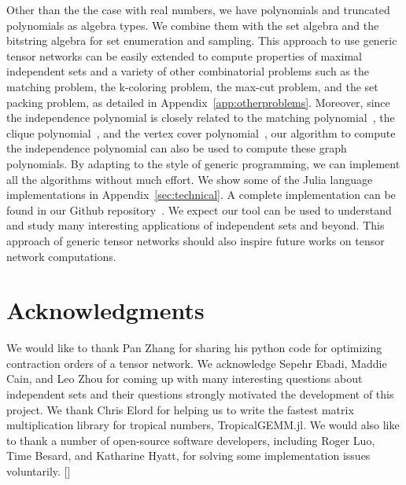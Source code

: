 \documentclass[onefignum, onetabnum]{siamart190516}
\newcommand{\<}{\langle}
\renewcommand{\>}{\rangle}
\newcommand{\App}[1]{Appendix~\ref{#1}}
\newcommand{\blue}[1]{[{\bf  \color{blue}{JG: #1}}]}
\begin{document}
Other than the the case with real numbers, we have polynomials and truncated polynomials as algebra types. We combine them with the set algebra and the bitstring algebra for set enumeration and sampling. 
This approach to use generic tensor networks can be easily extended to compute properties of maximal independent sets and a variety of other combinatorial problems such as the matching problem, the k-coloring problem, the max-cut problem, and the set packing problem, as detailed in \App{app:otherproblems}. 
Moreover, since the independence polynomial is closely related to the matching polynomial~\cite{Levit2005}, the clique polynomial~\cite{Hoede1994}, and the vertex cover polynomial~\cite{Akbari2013},
our algorithm to compute the independence polynomial can also be used to compute these graph polynomials.
By adapting to the style of generic programming, we can implement all the algorithms without much effort.
We show some of the Julia language implementations in Appendix~\ref{sec:technical}.
A complete implementation can be found in our Github repository~\cite{GraphTensorNetworks}. 
We expect our tool can be used to understand and study many interesting applications of independent sets and beyond. This approach of generic tensor networks should also inspire future works on tensor network computations. 

\section*{Acknowledgments}
We would like to thank Pan Zhang for sharing his python code for optimizing contraction orders of a tensor network.
We acknowledge Sepehr Ebadi, Maddie Cain, and Leo Zhou for coming up with many interesting questions about independent sets and their questions strongly motivated the development of this project.
We thank Chris Elord for helping us to write the fastest matrix multiplication library for tropical numbers, TropicalGEMM.jl. %
We would also like to thank a number of open-source software developers, including Roger Luo, Time Besard, and Katharine Hyatt, for solving some implementation issues voluntarily.
\blue{funding information}



\end{document}
